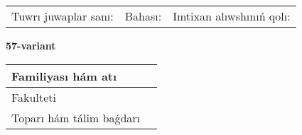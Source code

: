 \documentclass{article}
\begin{document}
\vspace{1cm}

\begin{tabular}{lll}
Tuwrı juwaplar sanı: \underline{\hspace{1.5cm}} & 
Bahası: \underline{\hspace{1.5cm}} & 
Imtixan alıwshınıń qolı: \underline{\hspace{2cm}} \\
\end{tabular}

\egroup

\newpage


\textbf{57-variant}\\

\bgroup
\def\arraystretch{1.6} %

\begin{tabular}{|m{5.7cm}|m{9.5cm}|}
\hline
Familiyası hám atı & \\
\hline
Fakulteti  & \\
\hline
Toparı hám tálim baǵdarı  & \\
\hline
\end{tabular}

\vspace{1cm}
\end{document}
